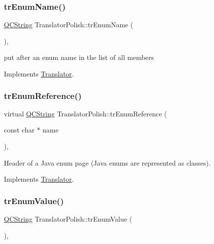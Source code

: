 \mbox{\label{class_translator_polish_ab8fccd21d327bd70d9f391bf84e052c5}} 
\subsubsection{\texorpdfstring{trEnumName()}{trEnumName()}}
{\footnotesize\ttfamily \mbox{\hyperlink{class_q_c_string}{Q\+C\+String}} Translator\+Polish\+::tr\+Enum\+Name (\begin{DoxyParamCaption}{ }\end{DoxyParamCaption})\hspace{0.3cm}{\ttfamily [inline]}, {\ttfamily [virtual]}}

put after an enum name in the list of all members 

Implements \mbox{\hyperlink{class_translator}{Translator}}.

\mbox{\label{class_translator_polish_a12ea60adab1b378ed45ad12b34fa5266}} 
\subsubsection{\texorpdfstring{trEnumReference()}{trEnumReference()}}
{\footnotesize\ttfamily virtual \mbox{\hyperlink{class_q_c_string}{Q\+C\+String}} Translator\+Polish\+::tr\+Enum\+Reference (\begin{DoxyParamCaption}\item[{const char $\ast$}]{name }\end{DoxyParamCaption})\hspace{0.3cm}{\ttfamily [inline]}, {\ttfamily [virtual]}}

Header of a Java enum page (Java enums are represented as classes). 

Implements \mbox{\hyperlink{class_translator}{Translator}}.

\mbox{\label{class_translator_polish_a1a96005738f33bd7724413dfcfb555f7}} 
\subsubsection{\texorpdfstring{trEnumValue()}{trEnumValue()}}
{\footnotesize\ttfamily \mbox{\hyperlink{class_q_c_string}{Q\+C\+String}} Translator\+Polish\+::tr\+Enum\+Value (\begin{DoxyParamCaption}{ }\end{DoxyParamCaption})\hspace{0.3cm}{\ttfamily [inline]}, {\ttfamily [virtual]}}

